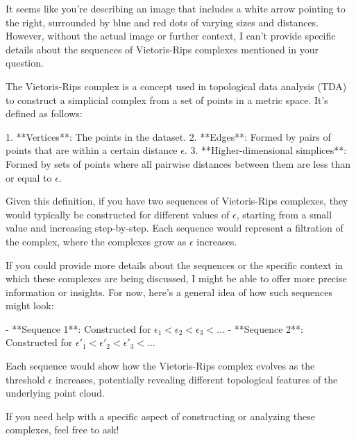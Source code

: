It seems like you're describing an image that includes a white arrow pointing to the right, surrounded by blue and red dots of varying sizes and distances. However, without the actual image or further context, I can't provide specific details about the sequences of Vietoris-Rips complexes mentioned in your question.

The Vietoris-Rips complex is a concept used in topological data analysis (TDA) to construct a simplicial complex from a set of points in a metric space. It's defined as follows:

1. **Vertices**: The points in the dataset.
2. **Edges**: Formed by pairs of points that are within a certain distance \( \epsilon \).
3. **Higher-dimensional simplices**: Formed by sets of points where all pairwise distances between them are less than or equal to \( \epsilon \).

Given this definition, if you have two sequences of Vietoris-Rips complexes, they would typically be constructed for different values of \( \epsilon \), starting from a small value and increasing step-by-step. Each sequence would represent a filtration of the complex, where the complexes grow as \( \epsilon \) increases.

If you could provide more details about the sequences or the specific context in which these complexes are being discussed, I might be able to offer more precise information or insights. For now, here’s a general idea of how such sequences might look:

- **Sequence 1**: Constructed for \( \epsilon_1 < \epsilon_2 < \epsilon_3 < \ldots \)
- **Sequence 2**: Constructed for \( \epsilon'_1 < \epsilon'_2 < \epsilon'_3 < \ldots \)

Each sequence would show how the Vietoris-Rips complex evolves as the threshold \( \epsilon \) increases, potentially revealing different topological features of the underlying point cloud.

If you need help with a specific aspect of constructing or analyzing these complexes, feel free to ask!